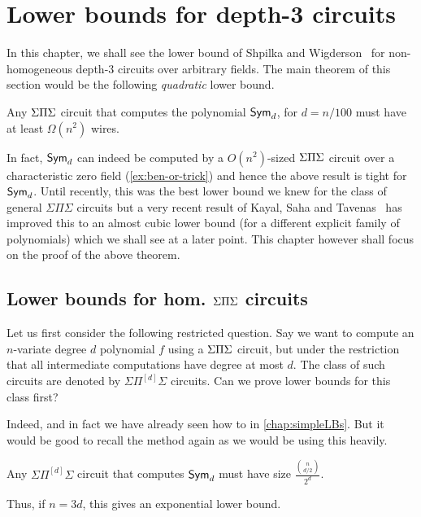 \chapter{Lower bounds for depth-3 circuits}\label{chap:d3SW}

In this chapter, we shall see the lower bound of Shpilka and Wigderson~\cite{sw2001} for non-homogeneous depth-$3$ circuits over arbitrary fields.
The main theorem of this section would be the following \emph{quadratic} lower bound. 

\begin{theorem}[\cite{sw2001}]\label{thm:SW-SPS-main-thm}
Any $\Sigma\Pi\Sigma$ circuit that computes the polynomial $\operatorname{\mathsf{Sym}}_d$, for $d = n/100$ must have at least $\Omega(n^2)$ wires. 
\end{theorem}

In fact, $\operatorname{\mathsf{Sym}}_d$ can indeed be computed by a $O(n^2)$-sized  $\Sigma\Pi\Sigma$ circuit over a characteristic zero field (\autoref{ex:ben-or-trick}) and hence the above result is tight for $\operatorname{\mathsf{Sym}}_d$. 
Until recently, this was the best lower bound we knew for the class of general $\Sigma\Pi\Sigma$ circuits but a very recent result of Kayal, Saha and Tavenas~\cite{kst16} has improved this to an almost cubic lower bound (for a different explicit family of polynomials) which we shall see at a later point.
This chapter however shall focus on the proof of the above theorem.

\section{Lower bounds for hom. $\Sigma\Pi\Sigma$ circuits \cite{nw1997}}

Let us first consider the following restricted question.
Say we want to compute an $n$-variate degree $d$ polynomial $f$ using a $\Sigma\Pi\Sigma$ circuit, but under the restriction that all intermediate computations have degree at most $d$.
The class of such circuits are denoted by $\Sigma\Pi^{[d]}\Sigma$ circuits.
Can we prove lower bounds for this class first?

Indeed, and in fact we have already seen how to in \autoref{chap:simpleLBs}. But it would be good to recall the method again as we would be using this heavily. 

\begin{theorem}[\cite{nw1997}]
Any $\Sigma\Pi^{[d]}\Sigma$ circuit that computes $\operatorname{\mathsf{Sym}}_d$ must have size $\frac{\binom{n}{d/2}}{2^d}$. 
\end{theorem}
Thus, if $n = 3d$, this gives an exponential lower bound. 

